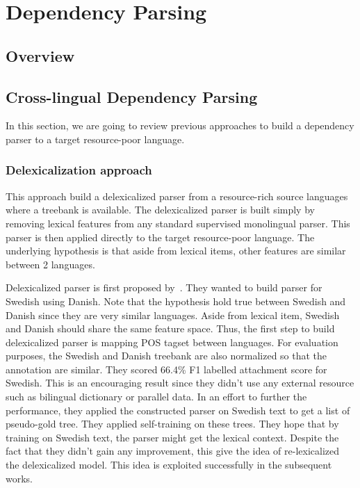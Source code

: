 \chapter{Dependency Parsing}
\section{Overview}
\section{Cross-lingual Dependency Parsing}
In this section, we are going to review previous approaches to build a dependency parser to a target resource-poor language. 

\subsection{Delexicalization approach}
This approach build a delexicalized parser from a resource-rich source languages where a treebank is available. The delexicalized parser is built simply by removing lexical features from any standard supervised monolingual parser. This parser is then applied directly to the target resource-poor language. The underlying hypothesis is that aside from lexical items, other features are similar between 2 languages. 

Delexicalized parser is first proposed by~\textbf{}. They wanted to build parser for Swedish using Danish. Note that the hypothesis hold true between Swedish and Danish since they are very similar languages. Aside from lexical item, Swedish and Danish should share the same feature space. Thus, the first step to build delexicalized parser is mapping POS tagset between languages. For evaluation purposes, the Swedish and Danish treebank are also normalized so that the annotation are similar. They scored 66.4\% F1 labelled attachment score for Swedish. This is an encouraging result since they didn't use any external resource such as bilingual dictionary or parallel data. In an effort to further the performance, they applied the constructed parser on Swedish text to get a list of pseudo-gold tree. They applied self-training on these trees. They hope that by training on Swedish text, the parser might get the lexical context. Despite the fact that they didn't gain any improvement, this give the idea of re-lexicalized the delexicalized model. This idea is exploited successfully in the subsequent works. 


